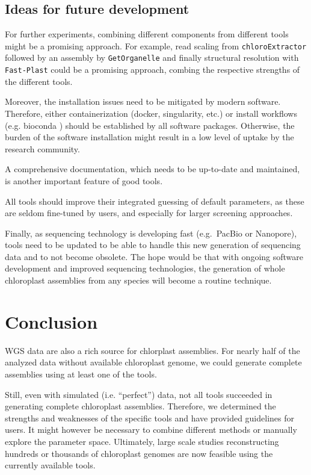 \documentclass{bmcart}
\newcommand{\formatprogramnames}[1]{\texttt{#1}}
\newcommand{\ce}{\formatprogramnames{chloroExtractor}}
\newcommand{\fp}{\formatprogramnames{Fast-Plast}}
\newcommand{\go}{\formatprogramnames{GetOrganelle}}
\begin{document}
\subsection*{Ideas for future development}
For further experiments, combining different components from different tools might be a promising approach.
For example, read scaling from \ce{} followed by an assembly by \go{} and finally structural resolution with \fp{} could be a promising approach, combing the respective strengths of the different tools.

Moreover, the installation issues need to be mitigated by modern software.
Therefore, either containerization (docker, singularity, etc.) or install workflows (e.g. bioconda \cite{gruening2018}) should be established by all software packages.
Otherwise, the burden of the software installation might result in a low level of uptake by the research community.

A comprehensive documentation, which needs to be up-to-date and maintained, is another important feature of good tools.

All tools should improve their integrated guessing of default parameters, as these are seldom fine-tuned by users, and especially for larger screening approaches.

Finally, as sequencing technology is developing fast (e.g.\ PacBio or Nanopore), tools need to be updated to be able to handle this new generation of sequencing data and to not become obsolete.
The hope would be that with ongoing software development and improved sequencing technologies, the generation of whole chloroplast assemblies from any species will become a routine technique.

\section*{Conclusion}

WGS data are also a rich source for chlorplast assemblies.
For nearly half of the analyzed data without available chloroplast genome, we could generate complete assemblies using at least one of the tools.

Still, even with simulated (i.e. ``perfect'') data, not all tools succeeded in generating complete chloroplast assemblies.
Therefore, we determined the strengths and weaknesses of the specific tools and have provided guidelines for users.
It might however be necessary to combine different methods or manually explore the parameter space.
Ultimately, large scale studies reconstructing hundreds or thousands of chloroplast genomes are now feasible using the currently available tools. 
\end{document}
